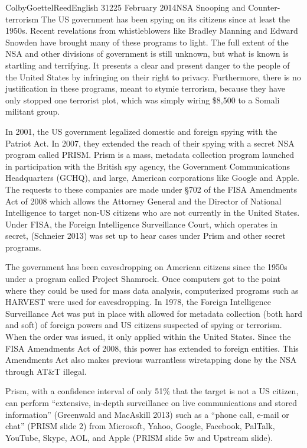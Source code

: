 \documentclass[12pt]{article}
\begin{document}
\begin{mla}{Colby}{Goettel}{Reed}{English 312}{25 February 2014}{NSA Snooping and Counter-terrorism}
The US government has been spying on its citizens since at least the 1950s. Recent revelations from whistleblowers like Bradley Manning and Edward Snowden have brought many of these programs to light. The full extent of the NSA and other divisions of government is still unknown, but what is known is startling and terrifying. It presents a clear and present danger to the people of the United States by infringing on their right to privacy. Furthermore, there is no justification in these programs, meant to stymie terrorism, because they have only stopped one terrorist plot, which was simply wiring \$8,500 to a Somali militant group.

In 2001, the US government legalized domestic and foreign spying with the Patriot Act. In 2007, they extended the reach of their spying with a secret NSA program called PRISM. Prism is a mass, metadata collection program launched in participation with the British spy agency, the Government Communications Headquarters (GCHQ), and large, American corporations like Google and Apple. The requests to these companies are made under \S702 of the FISA Amendments Act of 2008 which allows the Attorney General and the Director of National Intelligence to target non-US citizens who are not currently in the United States. Under FISA, the Foreign Intelligence Surveillance Court, which operates in secret, (Schneier 2013) was set up to hear cases under Prism and other secret programs.

The government has been eavesdropping on American citizens since the 1950s under a program called Project Shamrock. Once computers got to the point where they could be used for mass data analysis, computerized programs such as HARVEST were used for eavesdropping. In 1978, the Foreign Intelligence Surveillance Act was put in place with allowed for metadata collection (both hard and soft) of foreign powers and US citizens suspected of spying or terrorism. When the order was issued, it only applied within the United States. Since the FISA Amendments Act of 2008, this power has extended to foreign entities. This Amendments Act also makes previous warrantless wiretapping done by the NSA through AT\&T illegal.

Prism, with a confidence interval of only 51\% that the target is not a US citizen, can perform ``extensive, in-depth surveillance on live communications and stored information'' (Greenwald and MacAskill 2013) such as a ``phone call, e-mail or chat'' (PRISM slide 2) from Microsoft, Yahoo, Google, Facebook, PalTalk, YouTube, Skype, AOL, and Apple (PRISM slide 5w and Upstream slide).


\end{mla}
\end{document}
